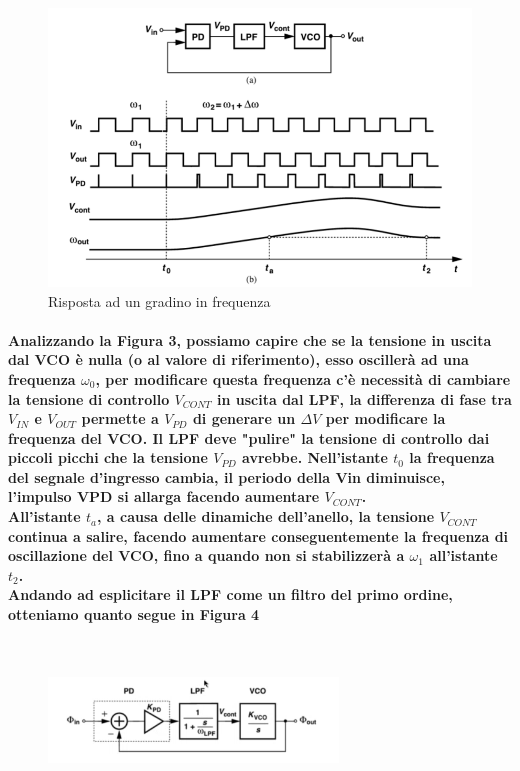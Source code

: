 \documentclass[a4paper]{article}
\begin{document}
~\begin{figure}[H]%
\includegraphics[scale=0.6]{PLLGradino.png} 
\caption{Risposta ad un gradino in frequenza}
\label{fig:foo}
\end{figure}
\paragraph{Analizzando la Figura 3, possiamo capire che se la tensione in uscita dal VCO è nulla (o al valore di riferimento), esso oscillerà ad una frequenza $\omega _{0}$, per modificare questa frequenza c'è necessità di cambiare la tensione di controllo $V_{CONT}$ in uscita dal LPF, la differenza di fase tra $V_{IN}$ e $V_{OUT}$ permette a $V_{PD}$ di generare un $\Delta V$ per modificare la frequenza del VCO. Il LPF deve "pulire" la tensione di controllo dai piccoli picchi che la tensione $V_{PD}$ avrebbe. 
Nell'istante $t_{0}$ la frequenza del segnale d'ingresso cambia, il periodo della Vin diminuisce, l'impulso VPD si allarga facendo aumentare $V_{CONT}$.
\\All'istante $t_{a}$, a causa delle dinamiche dell'anello, la tensione $V_{CONT}$ continua a salire, facendo aumentare conseguentemente la frequenza di oscillazione del VCO, fino a quando non si stabilizzerà a $\omega _{1}$ all'istante $t_{2}$.\\Andando ad esplicitare il LPF come un filtro del primo ordine, otteniamo quanto segue in Figura 4}
~\begin{figure}[H]%
\includegraphics[scale=1.5]{Esplicitato.png} 
\caption{}
\label{fig:foo}
\end{figure}
\end{document}
